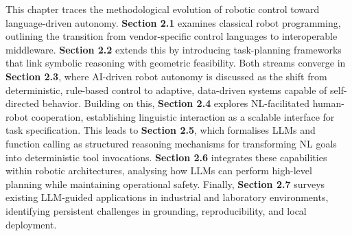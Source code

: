  
This chapter traces the methodological evolution of robotic control toward language-driven autonomy. \textbf{Section 2.1} examines classical robot programming, outlining the transition from vendor-specific control languages to interoperable middleware. \textbf{Section 2.2} extends this by introducing task-planning frameworks that link symbolic reasoning with geometric feasibility. Both streams converge in \textbf{Section 2.3}, where AI-driven robot autonomy is discussed as the shift from deterministic, rule-based control to adaptive, data-driven systems capable of self-directed behavior. Building on this, \textbf{Section 2.4} explores NL-facilitated human-robot cooperation, establishing linguistic interaction as a scalable interface for task specification. This leads to \textbf{Section 2.5}, which formalises LLMs and function calling as structured reasoning mechanisms for transforming NL goals into deterministic tool invocations. \textbf{Section 2.6} integrates these capabilities within robotic architectures, analysing how LLMs can perform high-level planning while maintaining operational safety. Finally, \textbf{Section 2.7} surveys existing LLM-guided applications in industrial and laboratory environments, identifying persistent challenges in grounding, reproducibility, and local deployment.

